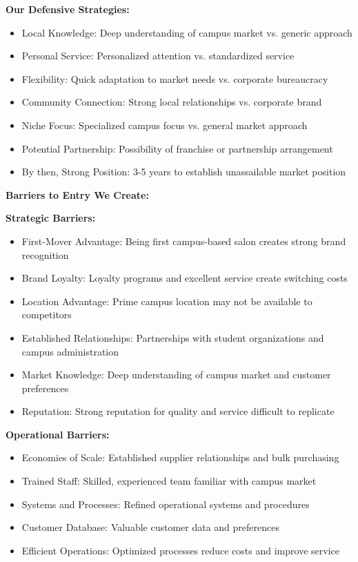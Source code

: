 \textbf{Our Defensive Strategies:}
\begin{itemize}[leftmargin=2em]
    \item Local Knowledge: Deep understanding of campus market vs. generic approach
    \item Personal Service: Personalized attention vs. standardized service
    \item Flexibility: Quick adaptation to market needs vs. corporate bureaucracy
    \item Community Connection: Strong local relationships vs. corporate brand
    \item Niche Focus: Specialized campus focus vs. general market approach
    \item Potential Partnership: Possibility of franchise or partnership arrangement
    \item By then, Strong Position: 3-5 years to establish unassailable market position
\end{itemize}

\vspace{1em}

\textbf{Barriers to Entry We Create:}

\textbf{Strategic Barriers:}
\begin{itemize}[leftmargin=2em]
    \item First-Mover Advantage: Being first campus-based salon creates strong brand recognition
    \item Brand Loyalty: Loyalty programs and excellent service create switching costs
    \item Location Advantage: Prime campus location may not be available to competitors
    \item Established Relationships: Partnerships with student organizations and campus administration
    \item Market Knowledge: Deep understanding of campus market and customer preferences
    \item Reputation: Strong reputation for quality and service difficult to replicate
\end{itemize}

\textbf{Operational Barriers:}
\begin{itemize}[leftmargin=2em]
    \item Economies of Scale: Established supplier relationships and bulk purchasing
    \item Trained Staff: Skilled, experienced team familiar with campus market
    \item Systems and Processes: Refined operational systems and procedures
    \item Customer Database: Valuable customer data and preferences
    \item Efficient Operations: Optimized processes reduce costs and improve service
\end{itemize}

